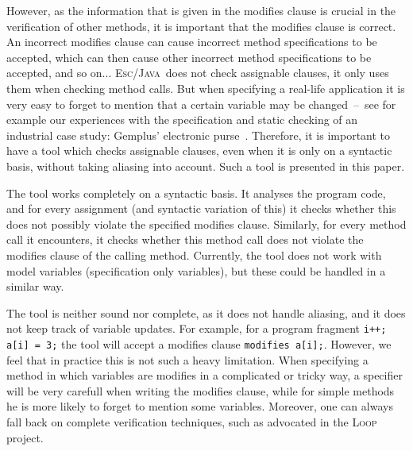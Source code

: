 \documentclass[a4paper]{llncs}
\newcommand{\escj}{\textsc{Esc/Java}}
\begin{document}
However, as the information that is given in the modifies clause is
crucial in the verification of other methods, it is important that the
modifies clause is correct. An incorrect modifies clause can cause
incorrect method specifications to be accepted, which can then cause
other incorrect method specifications to be accepted, and so
on... \escj\ does not check assignable clauses, it only uses them when
checking method calls. But when specifying a real-life application it
is very easy to forget to mention that a certain variable may be
changed~--~see for example our experiences with the specification and
static checking of an industrial case study: Gemplus' electronic
purse~\cite{CatanoH02a}. Therefore, it is important to have a tool
which checks assignable clauses, even when it is only on a syntactic
basis, without taking aliasing into account. Such a tool is presented
in this paper.

The tool works completely on a syntactic basis. It analyses the
program code, and for every assignment (and syntactic variation of
this) it checks whether this does not possibly violate the specified
modifies clause. Similarly, for every method call it encounters, it
checks whether this method call does not violate the modifies clause
of the calling method. Currently, the tool does not work with model
variables (specification only variables), but these could be handled
in a similar way.

The tool is neither sound nor complete, as it does not handle
aliasing, and it does not keep track of variable updates. For example,
for a program fragment \texttt{i++; a[i] = 3;} the tool will accept a
modifies clause \texttt{modifies a[i];}. However, we feel that in
practice this is not such a heavy limitation. When specifying a method
in which variables are modifies in a complicated or tricky way, a
specifier will be very carefull when writing the modifies clause,
while for simple methods he is more likely to forget to mention some
variables. Moreover, one can always fall back on complete verification
techniques, such as advocated in the \textsc{Loop} project.

\end{document}
